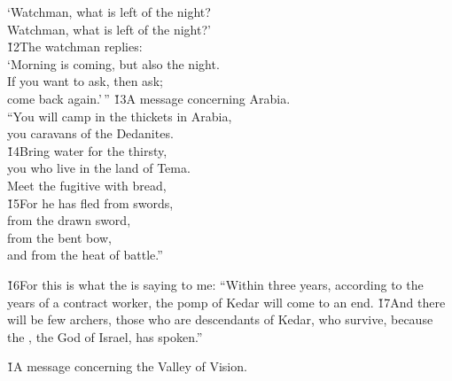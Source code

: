\begin{poetry}
\poemll    `Watchman, what is left of the night? \\
\poemlll       Watchman, what is left of the night?' \\
\poeml \v{12}The watchman replies: \\
\poemll    `Morning is coming, but also the night. \\
\poeml If you want to ask, then ask; \\
\poemll    come back again.'\,''
\poeml \v{13}A message concerning Arabia. \\
\poeml ``You will camp in the thickets in Arabia, \\
\poemll    you caravans of the Dedanites. \\
\poeml \v{14}Bring water for the thirsty, \\
\poemll    you who live in the land of Tema. \\
\poemlll       Meet the fugitive with bread, \\
\poeml \v{15}For he has fled from swords, \\
\poemll    from the drawn sword, \\
\poeml from the bent bow, \\
\poemll    and from the heat of battle.''
\end{poetry}

\v{16}For this is what the  is saying to me: ``Within three years, according to the years of a contract worker, the pomp of Kedar will come to an end. \v{17}And there will be few archers, those who are descendants of Kedar, who survive, because the , the God of Israel, has spoken.''

\v{1}A message concerning the Valley of Vision.

